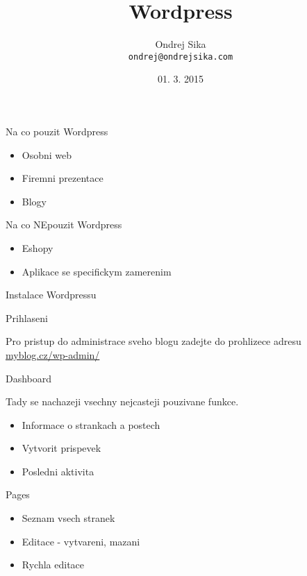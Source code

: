 \documentclass{beamer}
\title
    [Wordpress]
    {Wordpress}
\author
    [Ondrej Sika]
    {Ondrej Sika\\\texttt{ondrej@ondrejsika.com}}
\date
    {01. 3. 2015}
\begin{document}
\maketitle


\begin{frame}
    {Na co pouzit Wordpress}

    \begin{itemize}
        \item Osobni web
        \item Firemni prezentace
        \item Blogy
    \end{itemize}
\end{frame}


\begin{frame}
    {Na co NEpouzit Wordpress}

    \begin{itemize}
        \item Eshopy
        \item Aplikace se specifickym zamerenim
    \end{itemize}
\end{frame}


\begin{frame}
    {Instalace Wordpressu}
\end{frame}


\begin{frame}
    {Prihlaseni}

    Pro pristup do administrace sveho blogu zadejte do prohlizece adresu \url{myblog.cz/wp-admin/}
\end{frame}

\begin{frame}
    {Dashboard}

    Tady se nachazeji vsechny nejcasteji pouzivane funkce.

    \begin{itemize}
        \item Informace o strankach a postech
        \item Vytvorit prispevek
        \item Posledni aktivita
    \end{itemize}
\end{frame}


\begin{frame}
    {Pages}

    \begin{itemize}
        \item Seznam vsech stranek
        \item Editace - vytvareni, mazani
        \item Rychla editace
    \end{itemize}
\end{frame}
\end{document}
